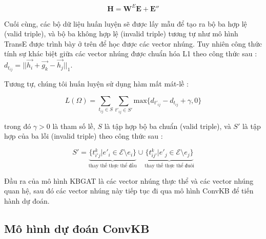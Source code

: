 \begin{equation}
	\label{eq:reInitEmbedding}
	\mathbf{H} = \mathbf{W}^E \mathbf{E} + \mathbf{E''}
\end{equation}

Cuối cùng, các bộ dữ liệu huấn luyện sẽ được lấy mẫu để tạo ra bộ ba hợp lệ (valid triple), và bộ ba không hợp lệ (invalid triple) tương tự như mô hình TransE được trình bày ở trên để học được các vector nhúng.
Tuy nhiên công thức tính sự khác biệt giữa các vector nhúng được chuẩn hóa L1 theo công thức sau  :
$d_{t_{ij}} = \big|\big|\vec{h_i}+ \vec{g_k}-\vec{h_j}\big|\big|_1$.

Tương tự, chúng tôi huấn luyện sử dụng hàm mất mát-lề :

\begin{equation}
	L(\Omega)=\sum_{t_{ij} \in S} \sum_{t'_{ij} \in S'} \text{max}\{d_{t'_{ij}} - d_{t_{ij}} + \gamma , 0 \}
\end{equation}

trong đó $\gamma > 0$ là tham số lề, $S$ là tập hợp bộ ba chuẩn (valid triple), và $S'$ là tập hợp của ba lỗi (invalid triple) theo công thức sau :

\begin{equation}
	{S'} ={\underbrace{\{ t^k_{i'j} | e'_i \in \mathcal{E}\setminus e_i\}}_{\text{thay thế thực thể đầu}}\cup \underbrace{\{ t^k_{ij'} | e'_j \in \mathcal{E}\setminus e_j\}}_{\text{thay thế thực thể đuôi}}}
\end{equation}

Đầu ra của mô hình KBGAT là các vector nhúng thực thể và các vector nhúng quan hệ, sau đó các vector nhúng này tiếp tục đi qua mô hình ConvKB để tiến hành dự đoán.

\subsection{Mô hình dự đoán ConvKB}
\label{sec:predictionConvKB}

